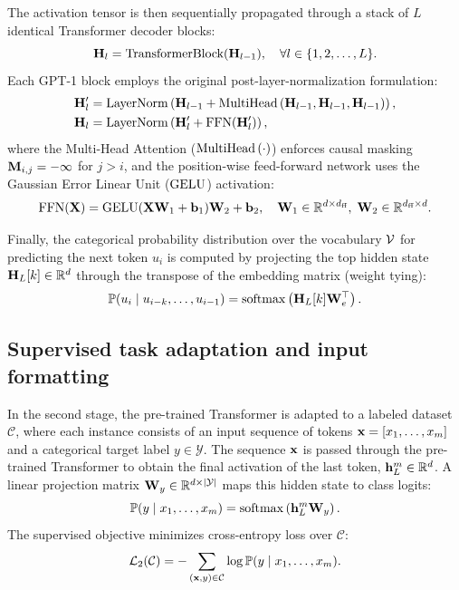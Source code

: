 \documentclass[../../main.tex]{subfiles}
\begin{document}
The activation tensor is then sequentially propagated through a stack of $L$ identical Transformer decoder blocks:
\begin{equation}
\label{eq:gpt1_layer_pass}
\mathbf{H}_l = \text{TransformerBlock}(\mathbf{H}_{l-1}), \quad \forall l \in \{1, 2, \dots, L\}.
\end{equation}
Each GPT-1 block employs the original post-layer-normalization formulation:
\begin{align}
\mathbf{H}'_l &= \operatorname{\mathrm{LayerNorm}}\left( \mathbf{H}_{l-1} + \operatorname{MultiHead}\left(\mathbf{H}_{l-1}, \mathbf{H}_{l-1}, \mathbf{H}_{l-1}\right) \right), \\
\mathbf{H}_l &= \operatorname{\mathrm{LayerNorm}}\left( \mathbf{H}'_l + \text{FFN}(\mathbf{H}'_l) \right),
\end{align}
where the Multi-Head Attention ($\operatorname{MultiHead}\left(\cdot\right)$) enforces causal masking $\mathbf{M}_{i,j} = -\infty$ for $j > i$, and the position-wise feed-forward network uses the Gaussian Error Linear Unit ($\operatorname{\mathrm{GELU}}$) activation:
\begin{equation}
\text{FFN}(\mathbf{X}) = \operatorname{\mathrm{GELU}}(\mathbf{X} \mathbf{W}_1 + \mathbf{b}_1) \mathbf{W}_2 + \mathbf{b}_2, \quad \mathbf{W}_1 \in \mathbb{R}^{d \times d_{\text{ff}}}, \; \mathbf{W}_2 \in \mathbb{R}^{d_{\text{ff}} \times d}.
\end{equation}

Finally, the categorical probability distribution over the vocabulary $\mathcal{V}$ for predicting the next token $u_i$ is computed by projecting the top hidden state $\mathbf{H}_L[k] \in \mathbb{R}^d$ through the transpose of the embedding matrix (weight tying):
\begin{equation}
\label{eq:gpt1_output_prob}
\mathbb{P}(u_i \mid u_{i-k}, \dots, u_{i-1}) = \operatorname{\mathrm{softmax}}\left( \mathbf{H}_L[k] \mathbf{W}_e^\top \right).
\end{equation}

\subsection{Supervised task adaptation and input formatting}
\label{subsec:gpt1_supervised_adaptation}

In the second stage, the pre-trained Transformer is adapted to a labeled dataset $\mathcal{C}$, where each instance consists of an input sequence of tokens $\mathbf{x} = [x_1, \dots, x_m]$ and a categorical target label $y \in \mathcal{Y}$. The sequence $\mathbf{x}$ is passed through the pre-trained Transformer to obtain the final activation of the last token, $\mathbf{h}_L^m \in \mathbb{R}^d$. A linear projection matrix $\mathbf{W}_y \in \mathbb{R}^{d \times |\mathcal{Y}|}$ maps this hidden state to class logits:
\begin{equation}
\label{eq:gpt1_supervised_prob}
\mathbb{P}(y \mid x_1, \dots, x_m) = \operatorname{\mathrm{softmax}}\left( \mathbf{h}_L^m \mathbf{W}_y \right).
\end{equation}
The supervised objective minimizes cross-entropy loss over $\mathcal{C}$:
\begin{equation}
\label{eq:gpt1_supervised_loss}
\mathcal{L}_2(\mathcal{C}) = -\sum_{(\mathbf{x}, y) \in \mathcal{C}} \log \mathbb{P}(y \mid x_1, \dots, x_m).
\end{equation}
\end{document}

